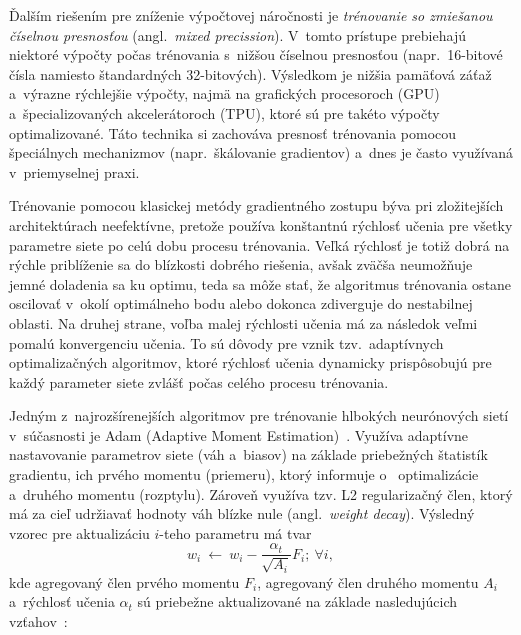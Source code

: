      Ďalším riešením pre zníženie výpočtovej náročnosti je \emph{trénovanie so zmiešanou číselnou presnosťou} (angl.\ \emph{mixed precission}). V~tomto prístupe prebiehajú niektoré výpočty počas trénovania s~nižšou číselnou presnosťou (napr.\ 16-bitové čísla namiesto štandardných 32-bitových). Výsledkom je nižšia pamäťová záťaž a~výrazne rýchlejšie výpočty, najmä na grafických procesoroch (GPU) a~špecializovaných akcelerátoroch (TPU), ktoré sú pre takéto výpočty optimalizované. Táto technika si zachováva presnosť trénovania pomocou špeciálnych mechanizmov (napr.\ škálovanie gradientov) a~dnes je často využívaná v~priemyselnej praxi.

      Trénovanie pomocou klasickej metódy gradientného zostupu býva pri zložitejších architektúrach neefektívne, pretože používa konštantnú rýchlosť učenia pre všetky parametre siete po celú dobu procesu trénovania. Veľká rýchlosť je totiž dobrá na rýchle priblíženie sa do blízkosti dobrého riešenia, avšak zväčša neumožňuje jemné doladenia sa ku optimu, teda sa môže stať, že algoritmus trénovania ostane oscilovať v~okolí optimálneho bodu alebo dokonca zdiverguje do nestabilnej oblasti. Na druhej strane, voľba malej rýchlosti učenia má za následok veľmi pomalú konvergenciu učenia. To sú dôvody pre vznik tzv.\ adaptívnych optimalizačných algoritmov, ktoré rýchlosť učenia dynamicky prispôsobujú pre každý parameter siete zvlášť počas celého procesu trénovania. 

      Jedným z~najrozšírenejších algoritmov pre trénovanie hlbokých neurónových sietí v~súčasnosti je Adam (Adaptive Moment Estimation)~\cite{kingmaAdamMethodStochastic2017}. Využíva adaptívne nastavovanie parametrov siete (váh a~biasov) na základe priebežných štatistík gradientu, ich prvého momentu (priemeru), ktorý informuje o~ optimalizácie a~druhého momentu (rozptylu). Zároveň využíva tzv. L2 regularizačný člen, ktorý má za cieľ udržiavať hodnoty váh blízke nule (angl.\ \emph{weight decay}). Výsledný vzorec pre aktualizáciu $i$-teho parametru má tvar
      \begin{equation}
        w_i \:\leftarrow\: w_i - \frac{\alpha_t}{\sqrt{A_i}} F_i ;\ \forall i,
      \end{equation}
      kde agregovaný člen prvého momentu $F_i$, agregovaný člen druhého momentu $A_i$ a~rýchlosť učenia $\alpha_t$ sú priebežne aktualizované na základe nasledujúcich vzťahov~\cite{aggarwalNeuralNetworksDeep2018}:

